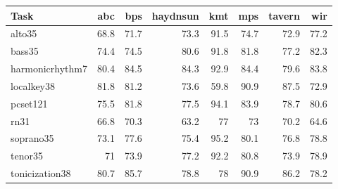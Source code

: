 \begin{tabular}{l|rrrrrrr}
Task             & \acrshort{abc}  & \acrshort{bps}  & \acrshort{haydnsun} & \acrshort{kmt} & \acrshort{mps}  & \acrshort{tavern} & \acrshort{wir}  \\ \hline
\gls{alto35}           & 68.8 & 71.7 & 73.3     & 91.5    & 74.7 & 72.9   & 77.2 \\
\gls{bass35}           & 74.4 & 74.5 & 80.6     & 91.8    & 81.8 & 77.2   & 82.3 \\
\gls{harmonicrhythm7}  & 80.4 & 84.5 & 84.3     & 92.9    & 84.4 & 79.6   & 83.8 \\
\gls{localkey38}       & 81.8 & 81.2 & 73.6     & 59.8    & 90.9 & 87.5   & 72.9 \\
\gls{pcset121} & 75.5 & 81.8 & 77.5     & 94.1    & 83.9 & 78.7   & 80.6 \\
\gls{rn31}   & 66.8 & 70.3 & 63.2     & 77      & 73   & 70.2   & 64.6 \\
\gls{soprano35}        & 73.1 & 77.6 & 75.4     & 95.2    & 80.1 & 76.8   & 78.8 \\
\gls{tenor35}          & 71   & 73.9 & 77.2     & 92.2    & 80.8 & 73.9   & 78.9 \\
\gls{tonicization38}   & 80.7 & 85.7 & 78.8     & 78      & 90.9 & 86.2   & 78.2
\end{tabular}
